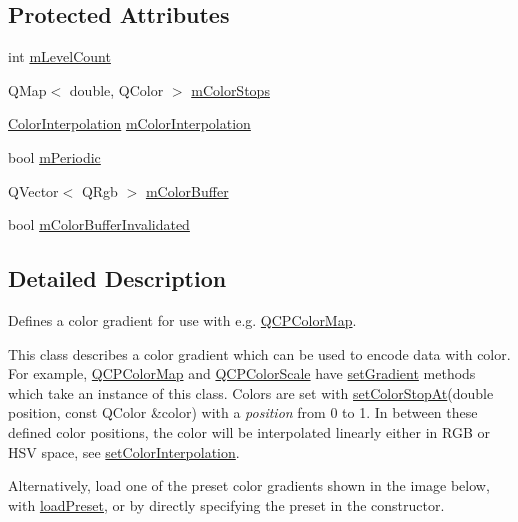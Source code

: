 \subsection*{Protected Attributes}
\begin{DoxyCompactItemize}
\item 
int \hyperlink{class_q_c_p_color_gradient_a98fb68e359904b2c991fcae3e38a211a}{m\+Level\+Count}
\item 
Q\+Map$<$ double, Q\+Color $>$ \hyperlink{class_q_c_p_color_gradient_a9e11a2b0974ef289d12c324822bc3a3e}{m\+Color\+Stops}
\item 
\hyperlink{class_q_c_p_color_gradient_ac5dca17cc24336e6ca176610e7f77fc1}{Color\+Interpolation} \hyperlink{class_q_c_p_color_gradient_a028cef73d863800a9ee93ffd641cce01}{m\+Color\+Interpolation}
\item 
bool \hyperlink{class_q_c_p_color_gradient_a4b07deeb20ca1ee2d5ea7e01bf0420af}{m\+Periodic}
\item 
Q\+Vector$<$ Q\+Rgb $>$ \hyperlink{class_q_c_p_color_gradient_af8b5f0739faa5f8295154d47ce38ecff}{m\+Color\+Buffer}
\item 
bool \hyperlink{class_q_c_p_color_gradient_abacf55e11f67d6722a687af1bb2687bd}{m\+Color\+Buffer\+Invalidated}
\end{DoxyCompactItemize}


\subsection{Detailed Description}
Defines a color gradient for use with e.\+g. \hyperlink{class_q_c_p_color_map}{Q\+C\+P\+Color\+Map}. 

This class describes a color gradient which can be used to encode data with color. For example, \hyperlink{class_q_c_p_color_map}{Q\+C\+P\+Color\+Map} and \hyperlink{class_q_c_p_color_scale}{Q\+C\+P\+Color\+Scale} have \hyperlink{class_q_c_p_color_map_a7313c78360471cead3576341a2c50377}{set\+Gradient} methods which take an instance of this class. Colors are set with \hyperlink{class_q_c_p_color_gradient_a3b48be5e78079db1bb2a1188a4c3390e}{set\+Color\+Stop\+At}(double position, const Q\+Color \&color) with a {\itshape position} from 0 to 1. In between these defined color positions, the color will be interpolated linearly either in R\+G\+B or H\+S\+V space, see \hyperlink{class_q_c_p_color_gradient_aa13fda86406e1d896a465a409ae63b38}{set\+Color\+Interpolation}.

Alternatively, load one of the preset color gradients shown in the image below, with \hyperlink{class_q_c_p_color_gradient_aa0aeec1528241728b9671bf8e60b1622}{load\+Preset}, or by directly specifying the preset in the constructor.



